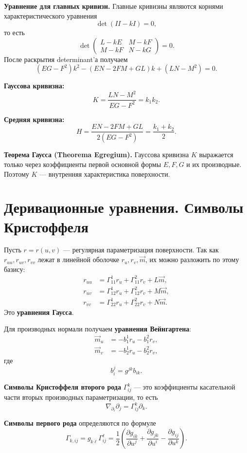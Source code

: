 \documentclass[12pt,a4paper]{article}
\begin{document}
\textbf{Уравнение для главных кривизн.}
Главные кривизны являются корнями характеристического уравнения
\[
\det(II-kI)=0,
\]
то есть
\[
\det
\begin{pmatrix}
L-kE & M-kF\\
M-kF & N-kG
\end{pmatrix}
=0.
\]
После раскрытия determinant'а получаем
\[
(EG-F^2)k^2-(EN-2FM+GL)k+(LN-M^2)=0.
\]

\textbf{Гауссова кривизна:}
\[
K=\frac{LN-M^2}{EG-F^2}=k_1k_2.
\]

\textbf{Средняя кривизна:}
\[
H=\frac{EN-2FM+GL}{2(EG-F^2)}=\frac{k_1+k_2}{2}.
\]

\textbf{Теорема Гаусса (Theorema Egregium).}
Гауссова кривизна $K$ выражается только через коэффициенты первой основной формы
$E,F,G$ и их производные. Поэтому $K$ --- внутренняя характеристика поверхности.

\section{Деривационные уравнения. Символы Кристоффеля}

Пусть $r=r(u,v)$ --- регулярная параметризация поверхности.
Так как $r_{uu},r_{uv},r_{vv}$ лежат в линейной оболочке $r_u,r_v,\vec{m}$,
их можно разложить по этому базису:
\begin{align*}
r_{uu} &= \Gamma_{11}^1 r_u+\Gamma_{11}^2 r_v+L\vec{m},\\
r_{uv} &= \Gamma_{12}^1 r_u+\Gamma_{12}^2 r_v+M\vec{m},\\
r_{vv} &= \Gamma_{22}^1 r_u+\Gamma_{22}^2 r_v+N\vec{m}.
\end{align*}
Это \textbf{уравнения Гаусса}.

Для производных нормали получаем \textbf{уравнения Вейнгартена}:
\begin{align*}
\vec{m}_u &= -b_1^1 r_u-b_1^2 r_v,\\
\vec{m}_v &= -b_2^1 r_u-b_2^2 r_v,
\end{align*}
где
\[
b_i^j=g^{jk}b_{ik}.
\]

\textbf{Символы Кристоффеля второго рода} $\Gamma^k_{ij}$ ---
это коэффициенты касательной части вторых производных параметризации, то есть
\[
\nabla_{\partial_i}\partial_j=\Gamma^k_{ij}\partial_k.
\]

\textbf{Символы первого рода} определяются по формуле
\[
\Gamma_{k,ij}=g_{k\ell}\Gamma^\ell_{ij}
=
\frac12\left(
\frac{\partial g_{ik}}{\partial u^j}
+
\frac{\partial g_{jk}}{\partial u^i}
-
\frac{\partial g_{ij}}{\partial u^k}
\right).
\]
\end{document}
